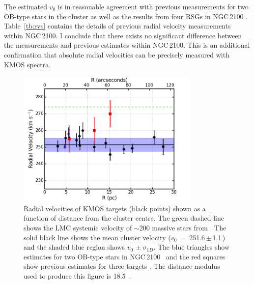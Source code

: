 The estimated $v_0$ is in reasonable agreement with previous measurements for two OB-type stars in the cluster
\citep{2015A&A...584A...5E} as well as the results from four RSGs in NGC\,2100
\citep[henceforth JT94; three of which were observed in the current study]{1994A&A...282..717J}.
Table~\ref{tb:rvs} contains the details of previous radial velocity measurements within NGC\,2100.
I conclude that there exists no significant difference between the measurements and previous estimates within NGC\,2100.
This is an additional confirmation that absolute radial velocities can be precisely measured with KMOS spectra.

\begin{figure}
 \centering
 \includegraphics[width=9.0cm]{ngc2100/NGC2100-rv-v10}
 \caption{Radial velocities of KMOS targets (black points) shown as a function of distance from the cluster centre.
The green dashed line shows the LMC systemic velocity of $\sim$200 massive stars from
 {\protect\citep[274.1\,$\pm$\,16.4\,\kms;][]{2015A&A...584A...5E}}.
 The solid black line shows the mean cluster velocity ($v_0$~=~251.6\,$\pm$\,1.1\,\kms) and the shaded blue region shows $v_0\,\pm\sigma_{1D}$.
 The blue triangles show estimates for two OB-type stars in NGC\,2100~\protect\citep{2015A&A...584A...5E} and the red squares show previous estimates for three targets
 {\citep{1994A&A...282..717J}}.
 The distance modulus used to produce this figure is 18.5~\citep{2013Natur.495...76P,2014AJ....147..122D}.
 \label{fig:rvs}}
\end{figure}

